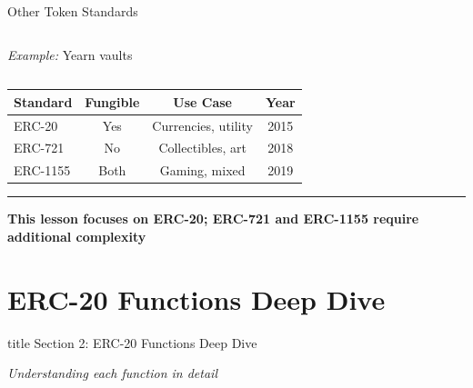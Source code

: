 \documentclass[8pt,aspectratio=169]{beamer}
\newcommand{\bottomnote}[1]{%
\vfill
\vspace{-2mm}
\textcolor{mllavender2}{\rule{\textwidth}{0.4pt}}
\vspace{1mm}
\footnotesize
\textbf{#1}
}
\begin{document}
\begin{frame}[t]{Other Token Standards}
\begin{columns}[T]
\vspace{0.3em}
\textit{Example:} Yearn vaults
\end{columns}

\vspace{0.5em}
\begin{center}
\begin{tabular}{lccc}
\toprule
\textbf{Standard} & \textbf{Fungible} & \textbf{Use Case} & \textbf{Year} \\
\midrule
ERC-20 & Yes & Currencies, utility & 2015 \\
ERC-721 & No & Collectibles, art & 2018 \\
ERC-1155 & Both & Gaming, mixed & 2019 \\
\bottomrule
\end{tabular}
\end{center}

\bottomnote{This lesson focuses on ERC-20; ERC-721 and ERC-1155 require additional complexity}
\end{frame}

\section{ERC-20 Functions Deep Dive}

\begin{frame}[t]
\vfill
\centering
\begin{beamercolorbox}[sep=8pt,center]{title}
\Large Section 2: ERC-20 Functions Deep Dive\par
\end{beamercolorbox}
\begin{center}
\textit{Understanding each function in detail}
\end{center}
\vfill
\end{frame}
\end{document}
